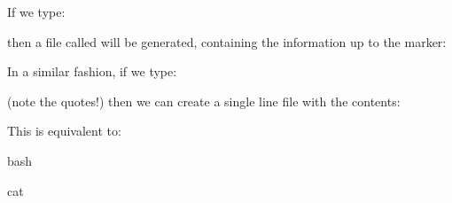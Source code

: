 \documentclass[letterpaper,10pt,english]{sphinxmanual}
\begin{document}
If we type:

\begin{sphinxVerbatim}[commandchars=\\\{\}]
   
   
   
\end{sphinxVerbatim}

then a file called  will be generated, containing the information up to the  marker:

\begin{sphinxVerbatim}[commandchars=\\\{\}]
   
   
\end{sphinxVerbatim}

In a similar fashion, if we type:

\begin{sphinxVerbatim}[commandchars=\\\{\}]
   
\end{sphinxVerbatim}

(note the quotes!) then we can create a single line file with the contents:

\begin{sphinxVerbatim}[commandchars=\\\{\}]
   
\end{sphinxVerbatim}

This is equivalent to:

\begin{sphinxVerbatim}[commandchars=\\\{\}]
     
\end{sphinxVerbatim}

{
\begin{sphinxVerbatim}[commandchars=\\\{\}]
\llap{\color{nbsphinxin}[11]:\,\hspace{\fboxrule}\hspace{\fboxsep}}\PYGZpc{}\PYGZpc{}bash

cat 
\end{sphinxVerbatim}
}
\end{document}
